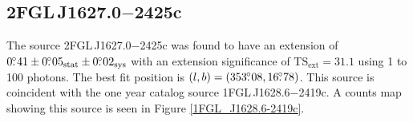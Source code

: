 \documentclass[12pt,preprint]{aastex}
\newcommand{\gev}{\text{GeV}\xspace}
\newcommand{\tsext}{{\ensuremath{\text{TS}_{\text{ext}}}}\xspace}
\newcommand{\sys}{\text{sys}\xspace}
\newcommand{\stat}{\text{stat}\xspace}
\begin{document}
%
    
\subsection{2FGL\,J1627.0$-$2425c}
\label{section_2FGL_J1627.0-2425c}


The source 2FGL\,J1627.0$-$2425c was found  to
have an extension of $0\fdg41\pm0\fdg05_\stat\pm0\fdg02_\sys$ with
an extension significance of $\tsext=31.1$
using 1 \gev to 100 \gev photons.  The best fit position is
$(l,b)=(353\mbox{$.\!\!^\circ$}08, 16\mbox{$.\!\!^\circ$}78)$.  This source is coincident with the one
year catalog source 1FGL\,J1628.6$-$2419c.  A counts map showing this source
is seen in Figure \ref{1FGL_J1628.6-2419c}.  
\end{document}

